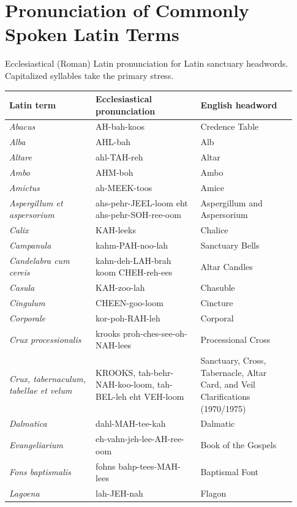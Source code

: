 \clearpage
\section{Pronunciation of Commonly Spoken Latin Terms}
Ecclesiastical (Roman) Latin pronunciation for Latin sanctuary headwords. Capitalized syllables take the primary stress.

{\footnotesize\begin{longtable}{>{\raggedright\arraybackslash}p{0.28\linewidth}>{\raggedright\arraybackslash}p{0.34\linewidth}>{\raggedright\arraybackslash}p{0.31\linewidth}}
\toprule
\textbf{Latin term} & \textbf{Ecclesiastical pronunciation} & \textbf{English headword} \\
\midrule
\endhead
\textit{Abacus} & AH-bah-koos & Credence Table \\
\textit{Alba} & AHL-bah & Alb \\
\textit{Altare} & ahl-TAH-reh & Altar \\
\textit{Ambo} & AHM-boh & Ambo \\
\textit{Amictus} & ah-MEEK-toos & Amice \\
\textit{Aspergillum et aspersorium} & ahs-pehr-JEEL-loom eht ahs-pehr-SOH-ree-oom & Aspergillum and Aspersorium \\
\textit{Calix} & KAH-leeks & Chalice \\
\textit{Campanula} & kahm-PAH-noo-lah & Sanctuary Bells \\
\textit{Candelabra cum cereis} & kahn-deh-LAH-brah koom CHEH-reh-ees & Altar Candles \\
\textit{Casula} & KAH-zoo-lah & Chasuble \\
\textit{Cingulum} & CHEEN-goo-loom & Cincture \\
\textit{Corporale} & kor-poh-RAH-leh & Corporal \\
\textit{Crux processionalis} & krooks proh-ches-see-oh-NAH-lees & Processional Cross \\
\textit{Crux, tabernaculum, tabellae et velum} & KROOKS, tah-behr-NAH-koo-loom, tah-BEL-leh eht VEH-loom & Sanctuary, Cross, Tabernacle, Altar Card, and Veil Clarifications (1970/1975) \\
\textit{Dalmatica} & dahl-MAH-tee-kah & Dalmatic \\
\textit{Evangeliarium} & eh-vahn-jeh-lee-AH-ree-oom & Book of the Gospels \\
\textit{Fons baptismalis} & fohns bahp-tees-MAH-lees & Baptismal Font \\
\textit{Lagoena} & lah-JEH-nah & Flagon \\

\end{longtable}}
